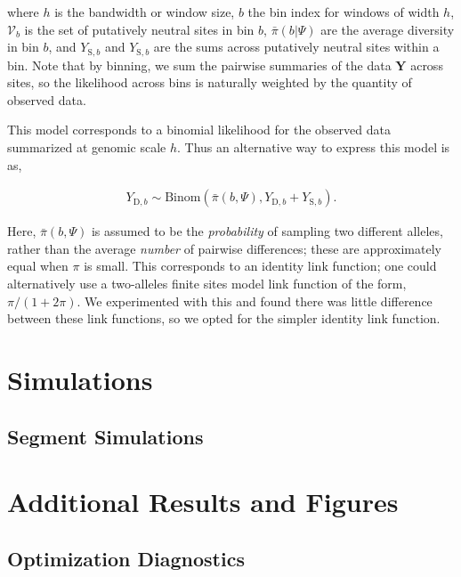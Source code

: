 \documentclass[11pt]{article}
\begin{document}
where $h$ is the bandwidth or window size, $b$ the bin index for windows of
width $h$, $\mathcal{V}_b$ is the set of putatively neutral sites in bin $b$,
$\bar{\pi}(b | \Psi)$ are the average diversity in bin $b$, and
$Y_{\text{S},b}$ and $Y_{\text{S},b}$ are the sums across putatively neutral
sites within a bin. Note that by binning, we sum the pairwise summaries of the
data $\mathbf{Y}$ across sites, so the likelihood across bins is naturally
weighted by the quantity of observed data. 



This model corresponds to a binomial likelihood for the observed data
summarized at genomic scale $h$. Thus an alternative way to express this model
is as, 

\begin{align}
  Y_{\text{D},b} \sim \text{Binom}(\bar{\pi}(b, \Psi), Y_{\text{D},b} + Y_{\text{S},b}).
\end{align}

Here, $\bar{\pi}(b, \Psi)$ is assumed to be the \emph{probability} of sampling
two different alleles, rather than the average \emph{number} of pairwise
differences; these are approximately equal when $\pi$ is small. This
corresponds to an identity link function; one could alternatively use a
two-alleles finite sites model link function of the form, $\pi/(1 + 2 \pi)$. We
experimented with this and found there was little difference between these link
functions, so we opted for the simpler identity link function.

\section{Simulations}

\subsection{Segment Simulations}

\section{Additional Results and Figures}

\subsection{Optimization Diagnostics}
\end{document}
